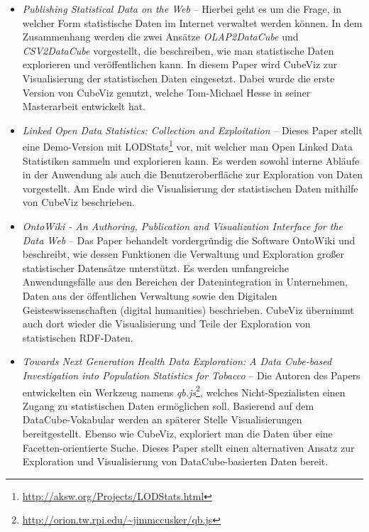\documentclass[11pt]{article}
\begin{document}
\begin{itemize}    
    \item \textit{Publishing Statistical Data on the Web} -- Hierbei geht es um die Frage, in welcher Form statistische Daten im Internet verwaltet werden können. In dem Zusammenhang werden die zwei Ansätze \textit{OLAP2DataCube} und \textit{CSV2DataCube} vorgestellt, die beschreiben, wie man statistische Daten explorieren und veröffentlichen kann. In diesem Paper wird CubeViz zur Visualisierung der statistischen Daten eingesetzt. Dabei wurde die erste Version von CubeViz genutzt, welche Tom-Michael Hesse in seiner Masterarbeit entwickelt hat. \cite{CUBEVIZ-PUBSTATIS}   
    
    \item \textit{Linked Open Data Statistics: Collection and Exploitation} -- Dieses Paper stellt eine Demo-Version mit LODStats\footnote{\url{http://aksw.org/Projects/LODStats.html}} vor, mit welcher man Open Linked Data Statistiken sammeln und explorieren kann. Es werden sowohl interne Abläufe in der Anwendung als auch die Benutzeroberfläche zur Exploration von Daten vorgestellt. Am Ende wird die Visualisierung der statistischen Daten mithilfe von CubeViz beschrieben. \cite{CUBEVIZ-VISZSTATS}     
    
    \item \textit{OntoWiki - An Authoring, Publication and Visualization Interface for the Data Web} -- Das Paper behandelt vordergründig die Software OntoWiki und beschreibt, wie dessen Funktionen die Verwaltung und Exploration großer statistischer Datensätze unterstützt. Es werden umfangreiche Anwendungsfälle aus den Bereichen der Datenintegration in Unternehmen, Daten aus der öffentlichen Verwaltung sowie den Digitalen Geisteswissenschaften (digital humanities) beschrieben. CubeViz übernimmt auch dort wieder die Visualisierung und Teile der Exploration von statistischen RDF-Daten. \cite{ONTOW-DATAWEB}
    
    \item \textit{Towards Next Generation Health Data Exploration: A Data Cube-based Investigation into Population Statistics for Tobacco} -- Die Autoren des Papers entwickelten ein Werkzeug namens \textit{qb.js}\footnote{\url{http://orion.tw.rpi.edu/~jimmccusker/qb.js}}, welches Nicht-Spezialisten einen Zugang zu statistischen Daten ermöglichen soll. Basierend auf dem DataCube-Vokabular werden an späterer Stelle Visualisierungen bereitgestellt. Ebenso wie CubeViz, exploriert man die Daten über eine Facetten-orientierte Suche. Dieses Paper stellt einen alternativen Ansatz zur Exploration und Visualisierung von DataCube-basierten Daten bereit.\cite{CUBEVIZ-ALTERAPPR}

\end{itemize}
\end{document}
